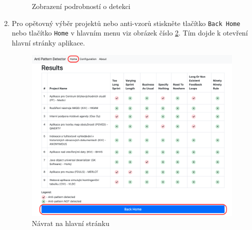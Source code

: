 \documentclass[czech,DP]{thesiskiv}
\begin{document}
\begin{enumerate}
\begin{figure}[!htb]
    \caption{Zobrazení podrobností o detekci}    
    \label{img:user_screen_10}
\end{figure}
\FloatBarrier
    \item Pro opětovný výběr projektů nebo anti-vzorů stiskněte tlačítko \texttt{Back Home} nebo tlačítko \texttt{Home} v hlavním menu viz obrázek číslo \ref{img:user_screen_5}. Tím dojde k otevření hlavní stránky aplikace.
\begin{figure}[!htb]
    \centering
    \includegraphics[width=350pt]{img/user_screen_5.png}
    \caption{Návrat na hlavní stránku}
    \label{img:user_screen_5}
\end{figure}
\FloatBarrier
\end{enumerate}
\end{document}
